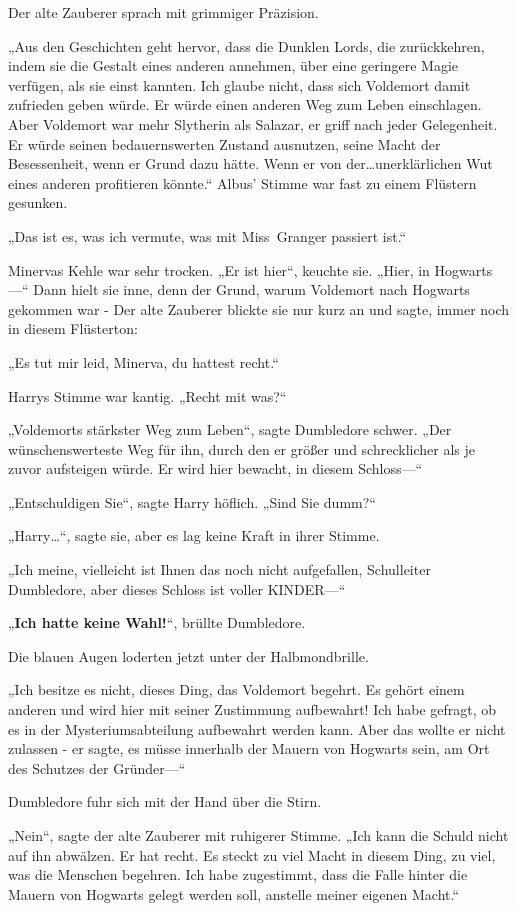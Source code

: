 {Der alte Zauberer sprach mit grimmiger Präzision.

„Aus den Geschichten geht hervor, dass die Dunklen Lords, die zurückkehren, indem sie die Gestalt eines anderen annehmen, über eine geringere Magie verfügen, als sie einst kannten. Ich glaube nicht, dass sich Voldemort damit zufrieden geben würde. Er würde einen anderen Weg zum Leben einschlagen. Aber Voldemort war mehr Slytherin als Salazar, er griff nach jeder Gelegenheit. Er würde seinen bedauernswerten Zustand ausnutzen, seine Macht der Besessenheit, wenn er Grund dazu hätte. Wenn er von der…unerklärlichen Wut eines anderen profitieren könnte.“ Albus' Stimme war fast zu einem Flüstern gesunken.

„Das ist es, was ich vermute, was mit Miss~Granger passiert ist.“

Minervas Kehle war sehr trocken. „Er ist hier“, keuchte sie. „Hier, in Hogwarts—“ Dann hielt sie inne, denn der Grund, warum Voldemort nach Hogwarts gekommen war - Der alte Zauberer blickte sie nur kurz an und sagte, immer noch in diesem Flüsterton:

„Es tut mir leid, Minerva, du hattest recht.“

Harrys Stimme war kantig. „Recht mit was?“

„Voldemorts stärkster Weg zum Leben“, sagte Dumbledore schwer. „Der wünschenswerteste Weg für ihn, durch den er größer und schrecklicher als je zuvor aufsteigen würde. Er wird hier bewacht, in diesem Schloss—“

„Entschuldigen Sie“, sagte Harry höflich. „Sind Sie dumm?“

„Harry…“, sagte sie, aber es lag keine Kraft in ihrer Stimme.

„Ich meine, vielleicht ist Ihnen das noch nicht aufgefallen, Schulleiter Dumbledore, aber dieses Schloss ist voller KINDER—“

„\textbf{Ich hatte keine Wahl!}“, brüllte Dumbledore.

Die blauen Augen loderten jetzt unter der Halbmondbrille.

„Ich besitze es nicht, dieses Ding, das Voldemort begehrt. Es gehört einem anderen und wird hier mit seiner Zustimmung aufbewahrt! Ich habe gefragt, ob es in der Mysteriumsabteilung aufbewahrt werden kann. Aber das wollte er nicht zulassen - er sagte, es müsse innerhalb der Mauern von Hogwarts sein, am Ort des Schutzes der Gründer—“

Dumbledore fuhr sich mit der Hand über die Stirn.

„Nein“, sagte der alte Zauberer mit ruhigerer Stimme. „Ich kann die Schuld nicht auf ihn abwälzen. Er hat recht. Es steckt zu viel Macht in diesem Ding, zu viel, was die Menschen begehren. Ich habe zugestimmt, dass die Falle hinter die Mauern von Hogwarts gelegt werden soll, anstelle meiner eigenen Macht.“

}
